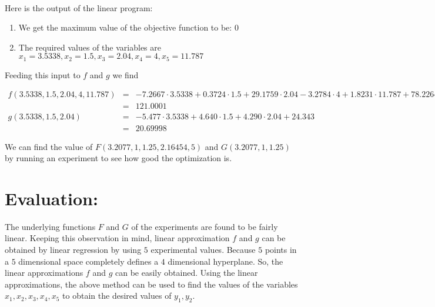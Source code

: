 \documentclass[11pt]{article}
\begin{document}
\paragraph{}
Here is the output of the linear program:
\begin{enumerate}
\item We get the maximum value of the objective function to be: $0$
\item The required values of the variables are $x_1 = 3.5338,x_2 = 1.5,x_3 = 2.04, x_4 = 4, x_5 = 11.787$
\end{enumerate}
Feeding this input to $f$ and $g$ we find
\begin{tiny}
\begin{eqnarray*}
f(3.5338, 1.5, 2.04, 4, 11.787) &=& -7.2667 \cdot 3.5338 + 0.3724 \cdot 1.5 + 29.1759 \cdot 2.04 - 3.2784 \cdot 4 + 1.8231 \cdot 11.787 + 78.2264\\
&=& 121.0001\\
g(3.5338, 1.5, 2.04) &=& -5.477 \cdot 3.5338 + 4.640 \cdot 1.5 + 4.290  \cdot 2.04 + 24.343\\
&=& 20.69998
\end{eqnarray*}
\end{tiny}
We can find the value of $F(3.2077, 1, 1.25, 2.16454, 5)$ and $G(3.2077, 1, 1.25)$ by running an experiment to see how good the optimization is.


\section{Evaluation:}
The underlying functions $F$ and $G$ of the experiments are found to be fairly linear. Keeping this observation in mind, linear approximation $f$ and $g$ can be obtained by linear regression by using $5$ experimental values. Because $5$ points in a $5$ dimensional space completely defines a $4$ dimensional hyperplane. So, the linear approximations $f$ and $g$ can be easily obtained. Using the linear approximations, the above method can be used to find the values of the variables $x_1,x_2,x_3,x_4,x_5$ to obtain the desired values of $y_1,y_2$.
\end{document}
